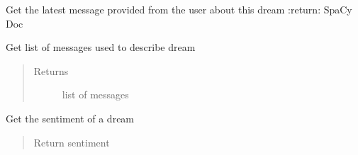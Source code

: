 \documentclass[letterpaper,10pt,english]{sphinxmanual}
\begin{document}
\begin{fulllineitems}
\begin{fulllineitems}
\begin{quote}
\begin{description}
\end{description}\end{quote}

\end{fulllineitems}


\begin{fulllineitems}
\label{\detokenize{index:Fralysis.Dream.Dream.get_latest_message}}
Get the latest message provided from the user about this dream
:return: SpaCy Doc

\end{fulllineitems}


\begin{fulllineitems}
\label{\detokenize{index:Fralysis.Dream.Dream.get_messages}}
Get list of messages used to describe dream
\begin{quote}\begin{description}
\item[{Returns}] \leavevmode
list of messages

\end{description}\end{quote}

\end{fulllineitems}


\begin{fulllineitems}
\label{\detokenize{index:Fralysis.Dream.Dream.get_ratings}}
Get the sentiment of a dream
\begin{quote}\begin{description}
\item[{Return sentiment}] \leavevmode
\end{description}\end{quote}

\end{fulllineitems}


\end{fulllineitems}
\end{document}
